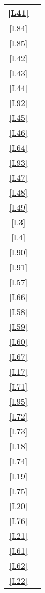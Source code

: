 \begin{longtable}{|c|c|}
	\hline \ref{L41} & \si \\ %
	\hline \ref{L84} & \si \\
	\hline \ref{L85} & \si \\
	\hline \ref{L42} & \si \\
	\hline \ref{L43} & \no \\
	\hline \ref{L44} & \si \\ %
	\hline \ref{L92} & \si \\
	\hline \ref{L45} & \si \\
	\hline \ref{L46} & \si \\
	\hline \ref{L64} & \si  \\
	\hline \ref{L93} & \si \\ %
	\hline \ref{L47} & \no \\
	\hline \ref{L48} & \no  \\
	\hline \ref{L49} & \no  \\
	\hline \ref{L3} & \si \\
	\hline \ref{L4} & \si \\ %
	\hline \ref{L90} & \si \\
	\hline \ref{L91} & \si \\	
	\hline \ref{L57} & \si \\
	\hline \ref{L66} & \si \\
	\hline \ref{L58} & \si \\ %
	\hline \ref{L59} & \si \\
	\hline \ref{L60} & \si \\
	\hline \ref{L67} & \si \\
	\hline \ref{L17} & \si \\
	\hline \ref{L71} & \si \\ %
	\hline \ref{L95} & \si \\
	\hline \ref{L72} & \si \\
	\hline \ref{L73} & \si \\
	\hline \ref{L18} & \si \\
	\hline \ref{L74} & \si \\ %
	\hline \ref{L19} & \si \\
	\hline \ref{L75} & \no \\
	\hline \ref{L20} & \no \\
	\hline \ref{L76} & \no \\	
	\hline \ref{L21} & \si \\ %
	\hline \ref{L61} & \si \\
	\hline \ref{L62} & \si \\
	\hline \ref{L22} & \si \\

\end{longtable}
